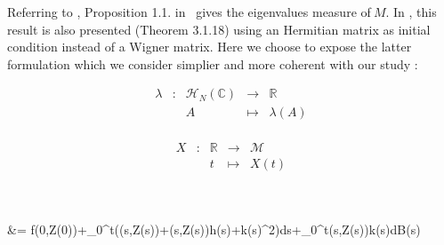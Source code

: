 		Referring to \cite{Jo2001}, Proposition 1.1. in \ gives the eigenvalues measure of$\ M$. In \cite{taotopics}, this result is also presented (Theorem 3.1.18) using an Hermitian matrix as initial condition instead of a Wigner matrix. Here we choose to expose the latter formulation which we consider simplier and more coherent with our study :

			\begin{figure}[h]
				\centering
				\begin{minipage}[b]{0.4\textwidth}
					\[ \begin{array}{ccccc}
					\lambda & : & \mathcal{H}_N(\mathbb{C}) & \to & \mathbb{R} \\
					 & & A & \mapsto & \lambda(A) \\
					\end{array} \]
				\end{minipage}
				\hspace{1cm}
				\begin{minipage}[b]{0.4\textwidth}
					\[ \begin{array}{ccccc}
					X & : & \mathbb{R} & \to & \mathcal{M} \\
					 & & t & \mapsto & X(t) \\
					\end{array} \]
				\end{minipage}
			\end{figure}\\ \newline

&= f(0,Z(0))+\int_0^t\left((s,Z(s))+(s,Z(s))h(s)+k(s)^2\right)ds+\int_0^t(s,Z(s))k(s)dB(s)
				\notag